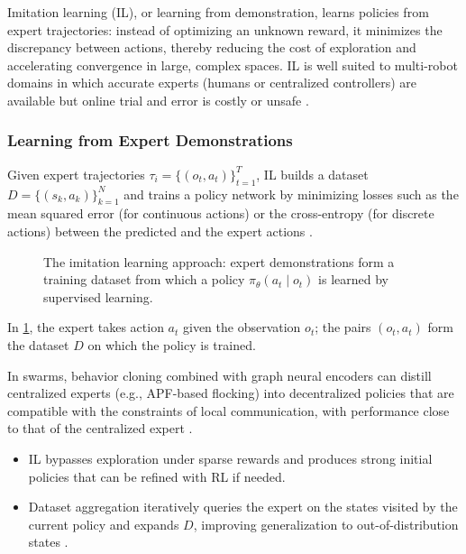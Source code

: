 Imitation learning (IL), or learning from demonstration, learns policies from
expert trajectories: instead of optimizing an unknown reward, it minimizes the
discrepancy between actions, thereby reducing the cost of exploration and
accelerating convergence in large, complex spaces. IL is well suited to
multi-robot domains in which accurate experts (humans or centralized controllers)
are available but online trial and error is costly or unsafe \cite{li2019twostage}.

\subsubsection{Learning from Expert Demonstrations}

Given expert trajectories $\tau_i = \{(o_t, a_t)\}_{t=1}^{T}$, IL builds a dataset
$D = \{(s_k, a_k)\}_{k=1}^{N}$ and trains a policy network by minimizing losses
such as the mean squared error (for continuous actions) or the cross-entropy (for
discrete actions) between the predicted and the expert actions \cite{li2019twostage}.

\begin{figure}[htbp]
  \centering
  \caption{The imitation learning approach: expert demonstrations form a training
           dataset from which a policy $\pi_\theta(a_t \mid o_t)$ is learned by
           supervised learning.}
  \label{fig:il}
\end{figure}

In \cref{fig:il}, the expert takes action $a_t$ given the observation $o_t$; the
pairs $(o_t, a_t)$ form the dataset $D$ on which the policy is trained.

In swarms, behavior cloning combined with graph neural encoders can distill
centralized experts (e.g., APF-based flocking) into decentralized policies that
are compatible with the constraints of local communication, with performance
close to that of the centralized expert \cite{guo2021imitation}.
\begin{itemize}
  \item {} IL bypasses exploration under sparse rewards and
        produces strong initial policies that can be refined with RL if needed.
  \item {} Dataset aggregation iteratively queries the expert on the
        states visited by the current policy and expands $D$, improving
        generalization to out-of-distribution states
        \cite{ross2011reduction,guo2021imitation}.
\end{itemize}

